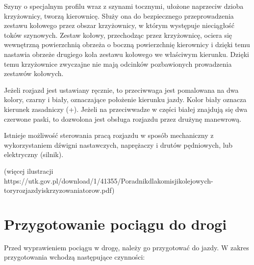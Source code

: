 Szyny o specjalnym profilu wraz z szynami tocznymi, ułożone naprzeciw dzioba krzyżownicy, tworzą kierownicę.
Służy ona do bezpiecznego przeprowadzenia zestawu kołowego przez obszar krzyżownicy, w którym występuje nieciągłość toków szynowych.  Zestaw kołowy, przechodząc przez krzyżownicę, ociera się wewnętrzną
powierzchnią obrzeża o boczną powierzchnię kierownicy i dzięki temu nastawia obrzeże drugiego koła zestawu kołowego we właściwym kierunku. Dzięki temu krzyżownice zwyczajne nie mają odcinków pozbawionych prowadzenia zestawów kołowych.

Jeżeli rozjazd jest ustawiany ręcznie, to przeciwwaga jest pomalowana na dwa kolory, czarny i biały, oznaczające położenie kierunku jazdy. Kolor biały oznacza kierunek zasadniczy (+). Jeżeli na przeciwwadze w części białej znajdują się dwa czerwone paski, to dozwolona jest obsługa rozjazdu przez drużynę manewrową.

Istnieje możliwość sterowania pracą rozjazdu w sposób mechaniczny z wykorzystaniem dźwigni nastawczych, naprężaczy i drutów pędniowych, lub elektryczny (silnik).

(więcej ilustracji https://utk.gov.pl/download/1/41355/Poradnikdlakomisjikolejowych-toryrozjazdyiskrzyzowaniatorow.pdf)

\section{Przygotowanie pociągu do drogi}

Przed wyprawieniem pociągu w drogę, należy go przygotować do jazdy. W zakres przygotowania wchodzą następujące czynności:

